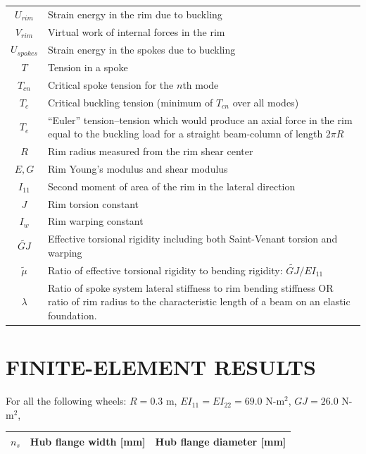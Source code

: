 \documentclass{bmd2016p}
\begin{document}
\begin{tabular}{c|p{12cm}}
$U_{rim}$	& Strain energy in the rim due to buckling\\
$V_{rim}$	& Virtual work of internal forces in the rim\\
$U_{spokes}$& Strain energy in the spokes due to buckling\\
$T$			& Tension in a spoke\\
$T_{cn}$	& Critical spoke tension for the $n$th mode\\
$T_c$		& Critical buckling tension (minimum of $T_{cn}$ over all modes)\\
$T_e$		& ``Euler'' tension--tension which would produce an axial force in the rim
			  equal to the buckling load for a straight beam-column of length $2\pi R$\\
$R$			& Rim radius measured from the rim shear center\\
$E, G$		& Rim Young's modulus and shear modulus\\
$I_{11}$	& Second moment of area of the rim in the lateral direction\\
$J$			& Rim torsion constant\\
$I_w$		& Rim warping constant\\
$\widetilde{GJ}$ & Effective torsional rigidity including both Saint-Venant torsion and warping\\
$\tilde{\mu}$ & Ratio of effective torsional rigidity to bending rigidity: $\widetilde{GJ}/EI_{11}$\\
$\lambda$	& Ratio of spoke system lateral stiffness to rim bending stiffness OR ratio
			  of rim radius to the characteristic length of a beam on an elastic foundation.\\
\hline
\end{tabular}


\newpage
\section*{FINITE-ELEMENT RESULTS}
For all the following wheels: $R=0.3$ m, $EI_{11}=EI_{22}=69.0$ N-m$^2$, $GJ=26.0$ N-m$^2$, 

\begin{tabular}{c|c|c}
$n_s$ & Hub flange width [mm] & Hub flange diameter [mm]\\
\hline

\end{tabular}
\end{document}
